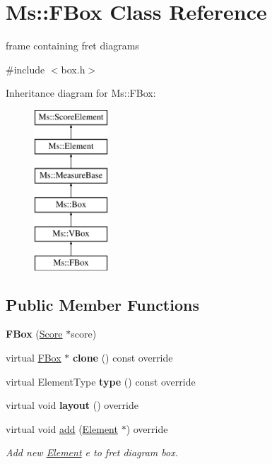 \hypertarget{class_ms_1_1_f_box}{}\section{Ms\+:\+:F\+Box Class Reference}
\label{class_ms_1_1_f_box}


frame containing fret diagrams  




{\ttfamily \#include $<$box.\+h$>$}

Inheritance diagram for Ms\+:\+:F\+Box\+:\begin{figure}[H]
\begin{center}
\leavevmode
\includegraphics[height=6.000000cm]{class_ms_1_1_f_box}
\end{center}
\end{figure}
\subsection*{Public Member Functions}
\begin{DoxyCompactItemize}
\item 
\mbox{\label{class_ms_1_1_f_box_a0db6ed0e8c3f596d93593139ce89381c}} 
{\bfseries F\+Box} (\hyperlink{class_ms_1_1_score}{Score} $\ast$score)
\item 
\mbox{\label{class_ms_1_1_f_box_a2d9348c3b7b77cb933254ea4c17068d2}} 
virtual \hyperlink{class_ms_1_1_f_box}{F\+Box} $\ast$ {\bfseries clone} () const override
\item 
\mbox{\label{class_ms_1_1_f_box_aa173de71711b896b11361234ebd5dd9d}} 
virtual Element\+Type {\bfseries type} () const override
\item 
\mbox{\label{class_ms_1_1_f_box_a8df1fd8d05d8ced8366aff0e08829c94}} 
virtual void {\bfseries layout} () override
\item 
\mbox{\label{class_ms_1_1_f_box_a316b799d51b16d28e16a9371baa59e61}} 
virtual void \hyperlink{class_ms_1_1_f_box_a316b799d51b16d28e16a9371baa59e61}{add} (\hyperlink{class_ms_1_1_element}{Element} $\ast$) override
\begin{DoxyCompactList}\small\item\em Add new \hyperlink{class_ms_1_1_element}{Element} {\itshape e} to fret diagram box. \end{DoxyCompactList}\end{DoxyCompactItemize}
